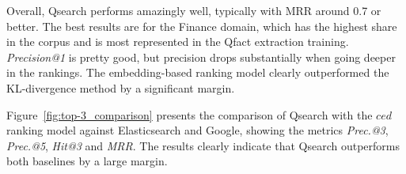 Overall, Qsearch performs amazingly well, typically with MRR around 0.7 or better.
The best results are for the 
Finance domain, which has the highest share in the corpus and is most represented in the
Qfact extraction training.
\textit{Precision@1} is pretty good, but precision drops substantially when going deeper in the rankings. 
The embedding-based ranking model clearly outperformed the KL-divergence method
by a significant margin.
 
Figure~\ref{fig:top-3_comparison} presents the comparison of Qsearch with the $ced$ ranking model 
against Elasticsearch and Google, showing the metrics \textit{Prec.@3}, \textit{Prec.@5}, \textit{Hit@3} and \textit{MRR}. The results 
clearly indicate that Qsearch outperforms both baselines by a large margin.












